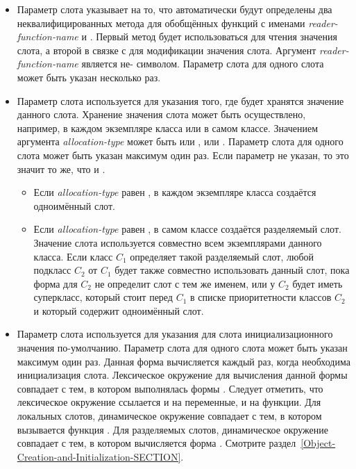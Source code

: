 \begin{defmac}
\begin{itemize}
\item 
Параметр слота  указывает на то, что автоматически будут определены
два неквалифицированных метода для обобщённых функций с именами
\emph{reader-function-name} и . Первый метод
будет использоваться для чтения значения слота, а второй в связке с 
для модификации значения слота.
Аргумент \emph{reader-function-name} является не- символом. Параметр
слота  для одного слота может быть указан несколько раз.

\item 
Параметр слота  используется для указания того, где будет
хранятся значение данного слота. Хранение значения слота может быть осуществлено,
например, в каждом экземпляре класса или в самом классе. Значением аргумента
\emph{allocation-type} может быть или , или . Параметр
слота  для одного слота может быть указан максимум один
раз. Если параметр  не указан, то это значит то же, что и
.

\begin{itemize}

\item 
Если \emph{allocation-type} равен , в каждом экземпляре класса
создаётся одноимённый слот.

\item 
Если \emph{allocation-type} равен , в самом классе создаётся
разделяемый слот. Значение слота используется совместно всем экземплярами
данного класса. Если класс $C_1$ определяет такой разделяемый слот, любой
подкласс $C_2$ от $C_1$ будет также совместно использовать данный слот, пока
форма  для $C_2$ не определит слот с тем же именем, или у $C_2$
будет иметь суперкласс, который стоит перед $C_1$ в списке приоритетности
классов $C_2$ и который содержит одноимённый слот.
\end{itemize}

\item 
Параметр слота  используется для указания для слота
инициализационного значения по-умолчанию. Параметр слота  для
одного слота может быть указан максимум один раз. Данная форма вычисляется
каждый раз, когда необходима инициализация слота.
Лексическое окружение для вычисления данной формы совпадает с тем, в котором
выполнялась формы . Следует отметить, что лексическое окружение
ссылается и на переменные, и на функции. Для локальных слотов, динамическое
окружение совпадает с тем, в котором вызывается функция . Для
разделяемых слотов, динамическое окружение совпадает с тем, в котором
вычисляется форма . Смотрите
раздел~\ref{Object-Creation-and-Initialization-SECTION}.


\end{itemize}
\end{defmac}
